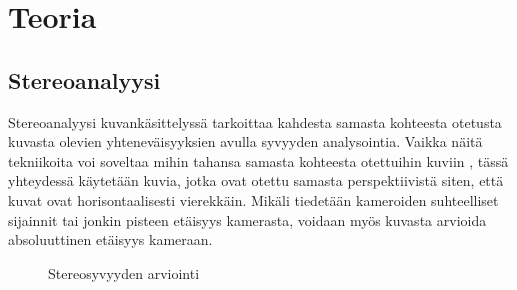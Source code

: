\chapter{Teoria}%
\label{ch:teoria}

\section{Stereoanalyysi}

Stereoanalyysi kuvankäsittelyssä tarkoittaa kahdesta samasta kohteesta otetusta kuvasta olevien yhteneväisyyksien avulla syvyyden analysointia.  
Vaikka näitä tekniikoita voi soveltaa mihin tahansa samasta kohteesta otettuihin kuviin \cite{SumiYasushi20023ORi}, 
tässä yhteydessä käytetään kuvia, jotka ovat otettu samasta perspektiivistä siten, että kuvat ovat horisontaalisesti vierekkäin. 
Mikäli tiedetään kameroiden suhteelliset sijainnit tai jonkin pisteen etäisyys kamerasta, voidaan myös kuvasta arvioida absoluuttinen etäisyys kameraan. 

\begin{figure}[h]
\centering
{}
\caption{Stereosyvyyden arviointi}
\label{fig:stereo}
\end{figure}
    
